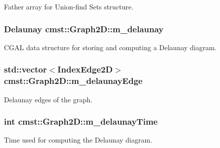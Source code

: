 Father array for Union-\/find Sets structure. 

\subsubsection[{\texorpdfstring{m\+\_\+delaunay}{m_delaunay}}]{\setlength{\rightskip}{0pt plus 5cm}Delaunay cmst\+::\+Graph2\+D\+::m\+\_\+delaunay\hspace{0.3cm}{\ttfamily [protected]}}\hypertarget{classcmst_1_1_graph2_d_af19557df59901e6078c2038652c95623}{}\label{classcmst_1_1_graph2_d_af19557df59901e6078c2038652c95623}


C\+G\+AL data structure for storing and computing a Delaunay diagram. 

\subsubsection[{\texorpdfstring{m\+\_\+delaunay\+Edge}{m_delaunayEdge}}]{\setlength{\rightskip}{0pt plus 5cm}std\+::vector$<${\bf Index\+Edge2D}$>$ cmst\+::\+Graph2\+D\+::m\+\_\+delaunay\+Edge\hspace{0.3cm}{\ttfamily [protected]}}\hypertarget{classcmst_1_1_graph2_d_a6fe64b2078ec3c700a8a2e2bd77e2dae}{}\label{classcmst_1_1_graph2_d_a6fe64b2078ec3c700a8a2e2bd77e2dae}


Delaunay edges of the graph. 

\subsubsection[{\texorpdfstring{m\+\_\+delaunay\+Time}{m_delaunayTime}}]{\setlength{\rightskip}{0pt plus 5cm}int cmst\+::\+Graph2\+D\+::m\+\_\+delaunay\+Time\hspace{0.3cm}{\ttfamily [private]}}\hypertarget{classcmst_1_1_graph2_d_a869a2fef63a6dbc8733056afd9ad0b71}{}\label{classcmst_1_1_graph2_d_a869a2fef63a6dbc8733056afd9ad0b71}


Time used for computing the Delaunay diagram. 


